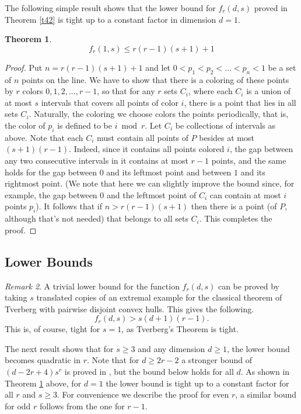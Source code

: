 \documentclass[11pt]{article}
\theoremstyle{plain}
\newtheorem{theorem}{Theorem}[section]
\theoremstyle{definition}
\theoremstyle{remark}
\newtheorem{remark}[theorem]{Remark}
\begin{document}
The following simple result shows that the lower bound for
$f_r(d,s)$ proved in  Theorem \ref{t42}
is tight up to a constant factor in
dimension $d=1$.

\begin{theorem}
	\label{t999}
$$
f_r(1,s) \leq r(r-1)(s+1)+1
$$
\end{theorem}
\begin{proof}
Put $n=r(r-1)(s+1)+1$ and let
$0<p_1 <p_2 < \ldots <p_n<1$ be a set of $n$ points on the line.
We have to show that there is a coloring of these points by $r$
colors $0,1,2,\ldots ,r-1$, so that for any $r$ sets
$C_i$, where each $C_i$ is a union of at most $s$ intervals
that covers all points of color $i$,
there is a point that lies in all sets $C_i$.  Naturally, the
coloring we choose colors the points periodically, that is, the
color of $p_i$ is defined to be $i \bmod r$. Let $C_i$
be collections of intervals as above. Note that each $C_i$ must
contain all points of $P$ besides at most 
$(s+1)(r-1)$. Indeed, since it contains all points colored $i$, the
gap between any two consecutive intervals in it contains at most
$r-1$ points, and the same holds for the gap between 
$0$ and its leftmost point and between $1$ and its rightmost point.
(We note that here we can slightly improve the bound since, for
example, the gap between $0$ and the leftmost point of $C_i$
can contain at most $i$ points $p_i$). It follows that if
$n>r(r-1)(s+1)$ then there is a point (of $P$, although that's not
needed) that belongs to all sets $C_i$. This completes the proof.
\end{proof}

\subsection{Lower Bounds}

\begin{remark}
A trivial lower bound for the function $f_r(d,s)$  can be proved by
taking $s$ translated copies of an extremal example for the classical
theorem of Tverberg with pairwise disjoint convex hulls. This gives
the following.
    $$f_r(d,s) > s(d+1)(r-1).$$
    This is, of course, tight for $s=1$, as Tverberg's Theorem  is
tight.
\end{remark}

 The next result shows that for
$s \geq 3$ and any dimension $d \geq 1$,
the lower bound becomes quadratic in $r$. Note that for
$d \geq 2r-2$ a stronger bound of $(d-2r+4)s^r$ is proved in
\cite{ChenETAL2025}, but the bound below holds for all $d$.
As shown in Theorem \ref{t999} above, for $d=1$ the
lower bound is tight up to 
a constant factor for all $r$ and $s \geq 3$. For convenience we
describe the proof for even $r$, a similar bound for odd $r$ follows
from the one for $r-1$.
\end{document}
